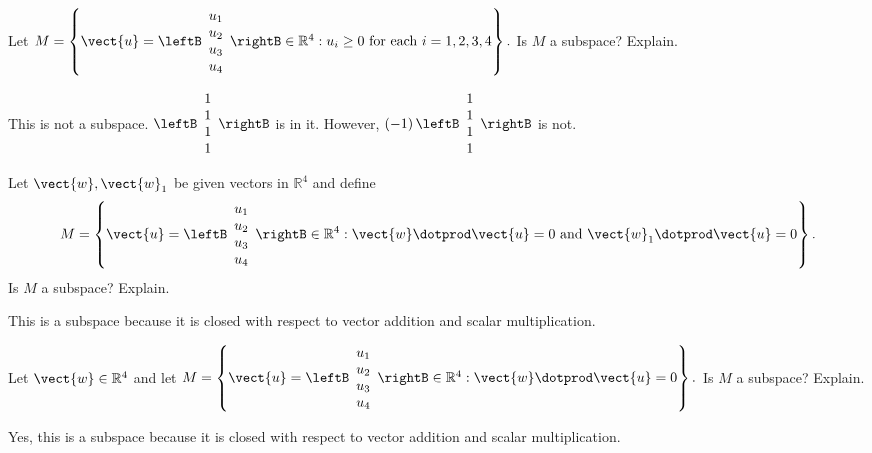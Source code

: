 \begin{enumialphparenastyle}
\begin{ex} Let $M=\left\{ \vect{u}=\leftB \begin{array}{c}
u_{1} \\
u_{2} \\
u_{3} \\
u_{4}
\end{array}\rightB \in 
\mathbb{R}^{4}:u_{i}\geq 0\text{ for each }i=1,2,3,4\right\} .$ Is $M$ a
subspace? Explain.
\begin{sol}
This is not a subspace. $\leftB \begin{array}{r}
1 \\
1 \\
1 \\
1
\end{array}
\rightB $
is in it. However, $\left( -1\right) \leftB
\begin{array}{r}
1 \\
1 \\
1 \\
1
\end{array}
\rightB $ is not.
\end{sol}
\end{ex}

\begin{ex} Let $\vect{w},\vect{w}_{1}$ be given vectors in $\mathbb{R}^{4}$ and define 
\begin{equation*}
M=\left\{ \vect{u}=\leftB \begin{array}{c}
u_{1} \\
u_{2} \\
u_{3} \\
u_{4}
\end{array}\rightB \in \mathbb{R}
^{4}:\vect{w}\dotprod \vect{u}=0\text{ and }\vect{w}_{1}\dotprod \vect{u}=0\right\}
.
\end{equation*}
Is $M$ a subspace? Explain.
\begin{sol}
This is a subspace because it is closed
with respect to vector addition and scalar multiplication.
\end{sol}
\end{ex}


\begin{ex} Let $\vect{w}\in \mathbb{R}^{4}$ and let $M=\left\{ \vect{u}
=\leftB 
\begin{array}{c}
u_{1} \\
u_{2} \\
u_{3} \\
u_{4}
\end{array}\rightB \in \mathbb{R}^{4}:\vect{w}\dotprod \vect{u}
=0\right\} .$ Is $M$ a subspace? Explain.
\begin{sol}
Yes, this is a subspace because it is closed with respect to vector addition and scalar multiplication.
\end{sol}
\end{ex}


\end{enumialphparenastyle}
